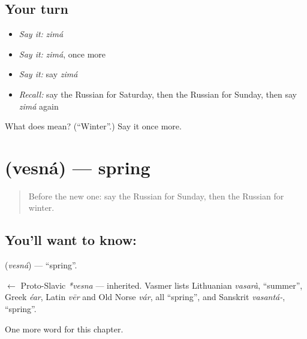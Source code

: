\subsection*{Your turn}
\begin{itemize}
\raggedright
  \item \emph{Say it:} \emph{zimá}
  \item \emph{Say it:} \emph{zimá}, once more
  \item \emph{Say it:} say \emph{zimá}
  \item \emph{Recall:} say the Russian for Saturday, then the Russian for Sunday, then say \emph{zimá} again
\end{itemize}

\begin{tcolorbox}[breakable,colback=teal!4,colframe=teal!35!black,title={Before you move on}]
What does  mean? (\textquotedblleft{}Winter\textquotedblright{}.) Say it once more.
\end{tcolorbox}
\section[\texorpdfstring{\ru{весна} (vesná)}{весна (vesná)}]{ (vesná) — spring}

\label{lesson:RU-C71-spring}



\begin{quote}
Before the new one: say the Russian for Sunday, then the Russian for winter.
\end{quote}

\subsection*{You'll want to know: }
\textbf{} (\emph{vesná}) — \textquotedblleft{}spring\textquotedblright{}.

\begin{cousinweb}
\textbf{} $\leftarrow$ Proto-Slavic \emph{*vesna} — inherited. Vasmer lists Lithuanian \emph{vasarà}, \textquotedblleft{}summer\textquotedblright{}, Greek \emph{éar}, Latin \emph{vēr} and Old Norse \emph{vár}, all \textquotedblleft{}spring\textquotedblright{}, and Sanskrit \emph{vasantá-}, \textquotedblleft{}spring\textquotedblright{}.
\end{cousinweb}

\begin{grammarlens}[title={What you've built}]
One more word for this chapter.
\end{grammarlens}

